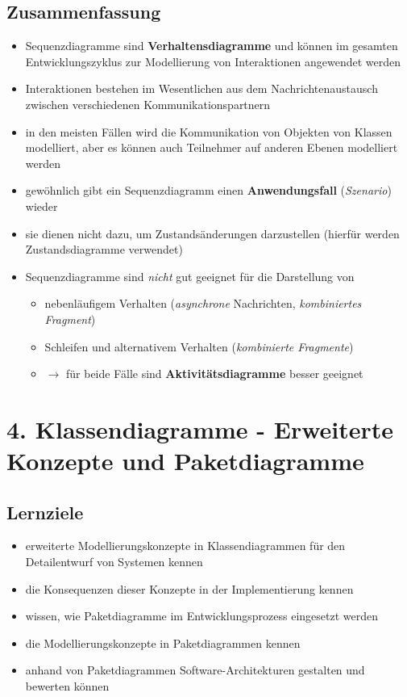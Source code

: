 \subsection*{Zusammenfassung}

\begin{itemize}
    \item Sequenzdiagramme sind \textbf{Verhaltensdiagramme}
    und können im gesamten Entwicklungszyklus zur Modellierung von Interaktionen angewendet werden
    \item Interaktionen bestehen im Wesentlichen aus dem Nachrichtenaustausch zwischen verschiedenen Kommunikationspartnern
    \item in den meisten Fällen wird die Kommunikation von Objekten von Klassen modelliert, aber es können auch Teilnehmer auf anderen Ebenen modelliert werden
    \item gewöhnlich gibt ein Sequenzdiagramm einen \textbf{Anwendungsfall} (\textit{Szenario}) wieder
    \item sie dienen nicht dazu, um Zustandsänderungen darzustellen (hierfür werden Zustandsdiagramme verwendet)
    \item Sequenzdiagramme sind \textit{nicht} gut geeignet für die Darstellung von
    \begin{itemize}
        \item nebenläufigem Verhalten (\textit{asynchrone} Nachrichten, \textit{kombiniertes Fragment})
        \item Schleifen und alternativem Verhalten (\textit{kombinierte Fragmente})
        \item[] $\rightarrow$  für beide Fälle sind \textbf{Aktivitätsdiagramme} besser geeignet
    \end{itemize}
\end{itemize}

\section*{4. Klassendiagramme - Erweiterte Konzepte und Paketdiagramme}

\subsection*{Lernziele}
\begin{itemize}
    \item erweiterte Modellierungskonzepte in Klassendiagrammen für den Detailentwurf von Systemen kennen
    \item die Konsequenzen dieser Konzepte in der Implementierung kennen
    \item wissen, wie Paketdiagramme im Entwicklungsprozess eingesetzt werden
    \item die Modellierungskonzepte in Paketdiagrammen kennen
    \item anhand von Paketdiagrammen Software-Architekturen gestalten und bewerten können
\end{itemize}

